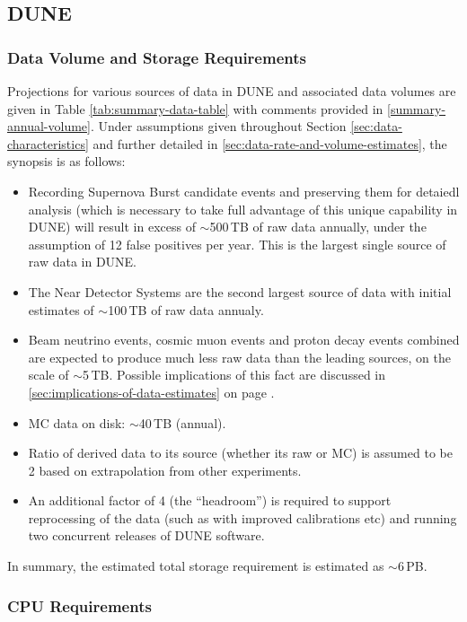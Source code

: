 \subsection{DUNE}
\subsubsection{Data Volume and Storage Requirements}
Projections for various sources of data in DUNE and associated data volumes are given in
Table \ref{tab:summary-data-table} with comments provided in \ref{summary-annual-volume}.
Under assumptions given throughout Section \ref{sec:data-characteristics} and further detailed
in \ref{sec:data-rate-and-volume-estimates}, the synopsis is as follows:
\begin{itemize}

\item Recording Supernova Burst candidate events and preserving them for detaiedl analysis (which is necessary to take
full advantage of this unique capability in DUNE) will result in excess of $\sim$500\,TB of raw data annually, under the assumption
of 12 false positives per year. This is the largest single source of raw data in DUNE.

\item The Near Detector Systems are the second largest source of data with initial estimates of $\sim$100\,TB of raw data annualy.

\item Beam neutrino events, cosmic muon events and proton decay events combined are expected to produce
much less raw data than the leading sources, on the scale of  $\sim$5\,TB. Possible implications of this fact
are discussed in \ref{sec:implications-of-data-estimates} on page \pageref{sec:implications-of-data-estimates}.

\item MC data on disk: $\sim$40\,TB (annual).

\item Ratio of derived data to its source (whether its raw or MC) is assumed to be 2 based on extrapolation from other experiments.

\item An additional factor of 4 (the ``headroom'') is required to support reprocessing of the data (such as with improved calibrations etc)
and running two concurrent releases of DUNE software.

\end{itemize}

In summary, the estimated total storage requirement is estimated as $\sim$6\,PB.

\subsubsection{CPU Requirements}
